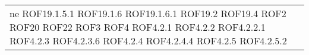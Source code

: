 \begin{longtable}{p{5cm}!{\VRule[1pt]}p{2.5cm}}
ne ROF19.1.5.1 \newline ROF19.1.6 \newline ROF19.1.6.1 \newline ROF19.2 \newline ROF19.4 \newline ROF2 \newline ROF20 \newline ROF22 \newline ROF3 \newline ROF4 \newline ROF4.2.1 \newline ROF4.2.2 \newline ROF4.2.2.1 \newline ROF4.2.3 \newline ROF4.2.3.6 \newline ROF4.2.4 \newline ROF4.2.4.4 \newline ROF4.2.5 \newline ROF4.2.5.2 \\

\end{longtable}
